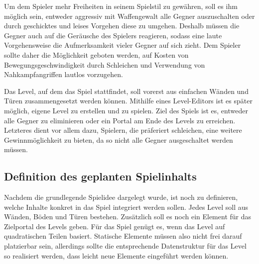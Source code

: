 Um dem Spieler mehr Freiheiten in seinem Spielstil zu gewähren, soll es ihm möglich sein, entweder aggressiv mit Waffengewalt alle Gegner auszuschalten oder durch geschicktes und leises Vorgehen diese zu umgehen. Deshalb müssen die Gegner auch auf die Geräusche des Spielers reagieren, sodass eine laute Vorgehensweise die Aufmerksamkeit vieler Gegner auf sich zieht. Dem Spieler sollte daher die Möglichkeit geboten werden, auf Kosten von Bewegungsgeschwindigkeit durch Schleichen und Verwendung von Nahkampfangriffen lautlos vorzugehen.

Das Level, auf dem das Spiel stattfindet, soll vorerst aus einfachen Wänden und Türen zusammengesetzt werden können. Mithilfe eines Level-Editors ist es später möglich, eigene Level zu erstellen und zu spielen. Ziel des Spiels ist es, entweder alle Gegner zu eliminieren oder ein Portal am Ende des Levels zu erreichen. Letzteres dient vor allem dazu, Spielern, die präferiert schleichen, eine weitere Gewinnmöglichkeit zu bieten, da so nicht alle Gegner ausgeschaltet werden müssen.

\subsection{Definition des geplanten Spielinhalts}\label{sec:plannedFeatures}
Nachdem die grundlegende Spielidee dargelegt wurde, ist noch zu definieren, welche Inhalte konkret in das Spiel integriert werden sollen. Jedes Level soll aus Wänden, Böden und Türen bestehen. Zusätzlich soll es noch ein Element für das Zielportal des Levels geben. Für das Spiel genügt es, wenn das Level auf quadratischen Teilen basiert. Statische Elemente müssen also nicht frei darauf platzierbar sein, allerdings sollte die entsprechende Datenstruktur für das Level so realisiert werden, dass leicht neue Elemente eingeführt werden können.

